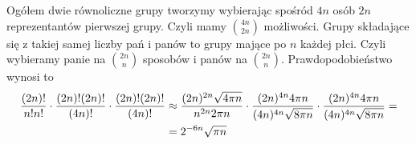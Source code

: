 \documentclass{article}
\begin{document}
Ogółem dwie równoliczne grupy tworzymy wybierając spośród $4n$ osób $2n$ reprezentantów pierwszej grupy. Czyli mamy ${4n\choose 2n}$ możliwości. Grupy składające się z takiej samej liczby pań i panów to grupy mające po $n$ każdej płci. Czyli wybieramy panie na ${2n\choose n}$ sposobów i panów na ${2n\choose n}$. Prawdopodobieństwo wynosi to 
\begin{align*}
    {(2n)!\over n!n!}\cdot{(2n)!(2n)!\over (4n)!}\cdot{(2n)!(2n)!\over(4n)!}&\approx{(2n)^{2n}\sqrt{4\pi n}\over n^{2n}2\pi n}\cdot{(2n)^{4n}4\pi n\over(4n)^{4n}\sqrt{8\pi n}}\cdot{(2n)^{4n}4\pi n\over(4n)^{4n}\sqrt{8\pi n}}=\\
    &={2^{-6n}\sqrt{\pi n}}
\end{align*}
\end{document}
